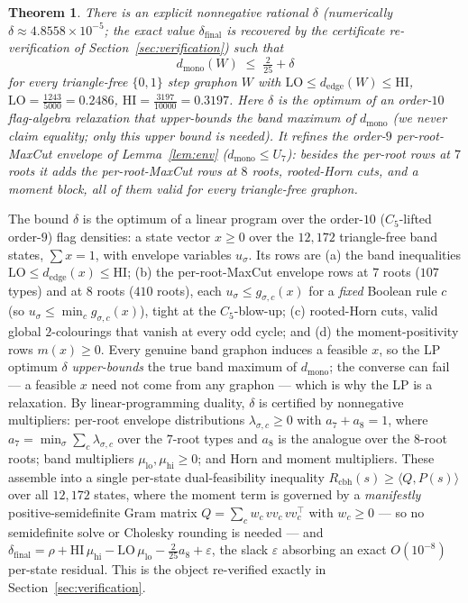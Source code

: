 \documentclass[11pt]{article}
\newtheorem{theorem}{Theorem}[section]
\theoremstyle{remark}
\newcommand{\dmono}{d_{\mathrm{mono}}}
\begin{document}
\begin{theorem}\label{thm:band}
There is an explicit nonnegative rational $\delta$ \textup{(}numerically
$\delta\approx 4.8558\times10^{-5}$; the exact value $\delta_{\mathrm{final}}$ is
recovered by the certificate re-verification of Section~\ref{sec:verification}\textup{)}
such that
\[
  \dmono(W)\;\le\;\tfrac{2}{25}+\delta
\]
for every triangle-free $\{0,1\}$ step graphon $W$ with
$\mathrm{LO}\le d_{\mathrm{edge}}(W)\le\mathrm{HI}$,
$\mathrm{LO}=\tfrac{1243}{5000}=0.2486$, $\mathrm{HI}=\tfrac{3197}{10000}=0.3197$.
Here $\delta$ is the optimum of an order-$10$ flag-algebra relaxation that
\emph{upper-bounds} the band maximum of $\dmono$ (we never claim equality; only this
upper bound is needed). It refines the order-$9$ per-root-MaxCut envelope of
Lemma~\ref{lem:env} \textup{(}$\dmono\le U_7$\textup{)}: besides the per-root rows at
$7$ roots it adds the per-root-MaxCut rows at $8$ roots, rooted-Horn cuts, and a
moment block, all of them valid for every triangle-free graphon.
\end{theorem}

The bound $\delta$ is the optimum of a linear program over the order-$10$
($C_5$-lifted order-$9$) flag densities: a state vector $x\ge0$ over the $12{,}172$
triangle-free band states, $\sum x=1$, with envelope variables $u_\sigma$. Its rows
are (a) the band inequalities $\mathrm{LO}\le d_{\mathrm{edge}}(x)\le\mathrm{HI}$;
(b) the per-root-MaxCut envelope rows at $7$ roots ($107$ types) and at $8$ roots
($410$ roots), each $u_\sigma\le g_{\sigma,c}(x)$ for a \emph{fixed} Boolean rule $c$
(so $u_\sigma\le\min_c g_{\sigma,c}(x)$), tight at the $C_5$-blow-up; (c) rooted-Horn
cuts, valid global $2$-colourings that vanish at every odd cycle; and (d) the
moment-positivity rows $m(x)\ge0$. Every genuine band graphon induces a feasible $x$,
so the LP optimum $\delta$ \emph{upper-bounds} the true band maximum of $\dmono$; the
converse can fail --- a feasible $x$ need not come from any graphon --- which is why
the LP is a relaxation. By linear-programming duality, $\delta$ is certified by
nonnegative multipliers: per-root envelope distributions $\lambda_{\sigma,c}\ge0$
with $a_7+a_8=1$, where $a_7=\min_\sigma\sum_c\lambda_{\sigma,c}$ over the $7$-root
types and $a_8$ is the analogue over the $8$-root roots; band multipliers
$\mu_{\mathrm{lo}},\mu_{\mathrm{hi}}\ge0$; and Horn and moment multipliers. These
assemble into a single per-state dual-feasibility inequality
$R_{\mathrm{cbh}}(s)\ge\langle Q,P(s)\rangle$ over all $12{,}172$ states, where the
moment term is governed by a \emph{manifestly} positive-semidefinite Gram matrix
$Q=\sum_c w_c\,vv_c\,vv_c^\top$ with $w_c\ge0$ --- so no semidefinite solve or
Cholesky rounding is needed --- and
$\delta_{\mathrm{final}}=\rho+\mathrm{HI}\,\mu_{\mathrm{hi}}-\mathrm{LO}\,\mu_{\mathrm{lo}}
-\tfrac{2}{25}a_8+\varepsilon$, the slack $\varepsilon$ absorbing an exact
$O(10^{-8})$ per-state residual. This is the object re-verified exactly in
Section~\ref{sec:verification}.
\end{document}
